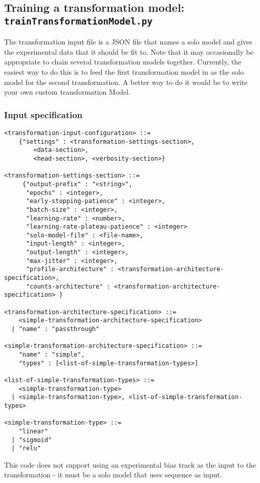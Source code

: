 \documentclass{article}
\begin{document}
\subsection{Training a transformation model: \texttt{trainTransformationModel.py}}

The transformation input file is a JSON file that names a solo model and gives the experimental
data that it should be fit to.
Note that it may occasionally be appropriate to chain several transformation models together.
Currently, the easiest way to do this is to feed the first transformation model in as the solo
model for the second transformation. A better way to do it would be to write your own custom
transformation Model.

\subsubsection{Input specification}
\begin{lstlisting}
<transformation-input-configuration> ::=
    {"settings" : <transformation-settings-section>,
        <data-section>,
        <head-section>, <verbosity-section>}

<transformation-settings-section> ::=
     {"output-prefix" : "<string>",
      "epochs" : <integer>,
      "early-stopping-patience" : <integer>,
      "batch-size" : <integer>,
      "learning-rate" : <number>,
      "learning-rate-plateau-patience" : <integer>
      "solo-model-file" : <file-name>,
      "input-length" : <integer>,
      "output-length" : <integer>,
      "max-jitter" : <integer>,
      "profile-architecture" : <transformation-architecture-specification>,
      "counts-architecture" : <transformation-architecture-specification> }

<transformation-architecture-specification> ::=
    <simple-transformation-architecture-specification>
  | "name" : "passthrough"

<simple-transformation-architecture-specification> ::=
    "name" : "simple",
    "types" : [<list-of-simple-transformation-types>]

<list-of-simple-transformation-types> ::=
    <simple-transformation-type>
  | <simple-transformation-type>, <list-of-simple-transformation-types>

<simple-transformation-type> ::=
    "linear"
  | "sigmoid"
  | "relu"

\end{lstlisting}

This code does not support using an experimental bias track as the input to the
transformation - it must be a solo model that uses sequence as input.
\end{document}
